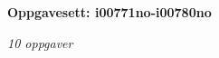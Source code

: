 \centerline{\bf Oppgavesett: i00771no-i00780no}
\vskip 10pt
\centerline{\it 10 oppgaver}\vskip 10pt
\vskip 10pt

